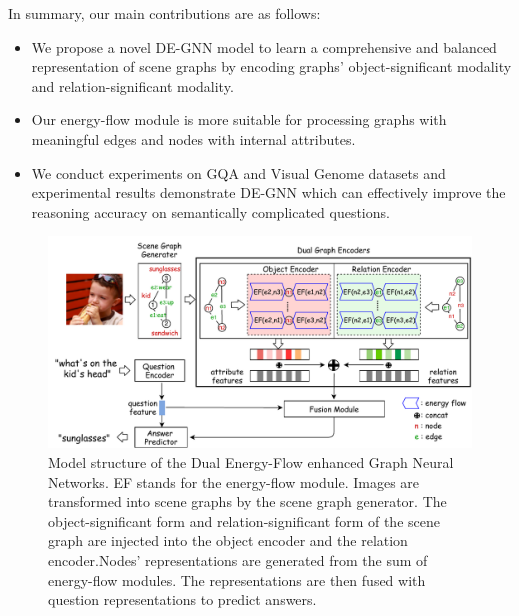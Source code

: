\documentclass[letterpaper]{article} %
\begin{document}
In summary, our main contributions are as follows:%
\begin{itemize}
\setlength{\itemsep}{5pt}
\setlength{\parsep}{5pt}
\setlength{\parskip}{5pt}
\item We propose a novel DE-GNN model to learn a comprehensive and balanced representation of scene graphs by encoding graphs' object-significant modality and relation-significant modality.\vspace{-0.06in}

\item Our energy-flow module is more suitable for processing graphs with meaningful edges and nodes with internal attributes.\vspace{-0.06in}

\item We conduct experiments on GQA and Visual Genome datasets and experimental results demonstrate DE-GNN which can effectively improve the reasoning accuracy on semantically complicated questions.
\end{itemize}\vspace{-0.06in}

\begin{figure}[ht] 
    \centering 
    \includegraphics[width=1.0\textwidth]{./pic/DE-GNN.pdf} 
    \caption{Model structure of the Dual Energy-Flow enhanced Graph Neural Networks. EF stands for the energy-flow module. Images are transformed into scene graphs by the scene graph generator. The object-significant form and relation-significant form of the scene graph are injected into the object encoder and the relation encoder.Nodes' representations are generated from the sum of energy-flow modules. The representations are then fused with question representations to predict answers.} 
    \label{fig2} 
\end{figure}
\end{document}
